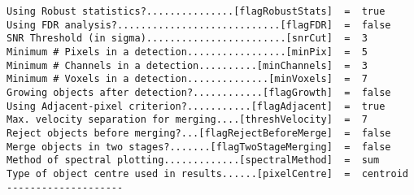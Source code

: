 {\begin{verbatim}
Using Robust statistics?...............[flagRobustStats]  =  true
Using FDR analysis?............................[flagFDR]  =  false
SNR Threshold (in sigma)........................[snrCut]  =  3
Minimum # Pixels in a detection.................[minPix]  =  5
Minimum # Channels in a detection..........[minChannels]  =  3
Minimum # Voxels in a detection..............[minVoxels]  =  7
Growing objects after detection?............[flagGrowth]  =  false
Using Adjacent-pixel criterion?...........[flagAdjacent]  =  true
Max. velocity separation for merging....[threshVelocity]  =  7
Reject objects before merging?...[flagRejectBeforeMerge]  =  false
Merge objects in two stages?.......[flagTwoStageMerging]  =  false
Method of spectral plotting.............[spectralMethod]  =  sum
Type of object centre used in results......[pixelCentre]  =  centroid
--------------------
\end{verbatim}
}

